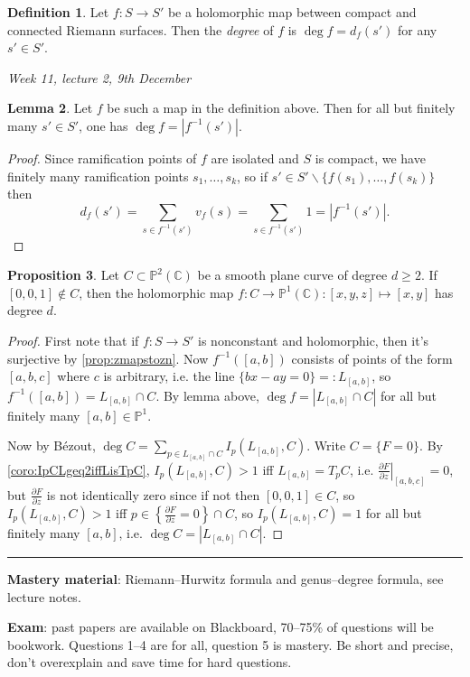 \documentclass{article}
\newcommand{\C}{\mathbb{C}}
\newcommand{\p}{\mathbb{P}}
\theoremstyle{definition}
\newtheorem{defn}{Definition}[subsection]
\newtheorem{prop}[defn]{Proposition}
\newtheorem{lemma}[defn]{Lemma}
\begin{document}
\begin{defn}
Let $f:S\rightarrow S'$ be a holomorphic map between compact and connected Riemann surfaces. Then the \textit{degree} of $f$ is $\deg f=d_f(s')$ for any $s'\in S'$.
\end{defn}

\begin{flushright}
\textit{Week 11, lecture 2, 9th December}
\end{flushright}

\begin{lemma}
Let $f$ be such a map in the definition above. Then for all but finitely many $s'\in S'$, one has $\deg f=\left|f^{-1}(s')\right|$.
\end{lemma}
\begin{proof}
Since ramification points of $f$ are isolated and $S$ is compact, we have finitely many ramification points $s_1,\ldots,s_k$, so if $s'\in S'\backslash\{f(s_1),\ldots,f(s_k)\}$ then
\[
d_f(s')=\sum_{s\in f^{-1}(s')}v_f(s)=\sum_{s\in f^{-1}(s')}1=\left|f^{-1}(s')\right|.
\]
\end{proof}

\begin{prop}
Let $C\subset\p^2(\C)$ be a smooth plane curve of degree $d\geq 2$. If $[0,0,1]\notin C$, then the holomorphic map $f:C\rightarrow\p^1(\C):[x,y,z]\mapsto [x,y]$ has degree $d$.
\end{prop}
\begin{proof}
First note that if $f:S\rightarrow S'$ is nonconstant and holomorphic, then it's surjective by \ref{prop:zmapstozn}. Now $f^{-1}([a,b])$ consists of points of the form $[a,b,c]$ where $c$ is arbitrary, i.e. the line $\{bx-ay=0\}=:L_{[a,b]}$, so $f^{-1}([a,b])=L_{[a,b]}\cap C$. By lemma above, $\deg f=\left|L_{[a,b]}\cap C\right|$ for all but finitely many $[a,b]\in\p^1$.

Now by Bézout, $\deg C=\sum_{p\in L_{[a,b]}\cap C}I_p\left(L_{[a,b]},C\right)$. Write $C=\{F=0\}$. By \ref{coro:IpCLgeq2iffLisTpC}, $I_p\left(L_{[a,b]},C\right)>1$ iff $L_{[a,b]}=T_pC$, i.e. $\left. \frac{\partial F}{\partial z}\right|_{[a,b,c]}=0$, but $\frac{\partial F}{\partial z}$ is not identically zero since if not then $[0,0,1]\in C$, so $I_p\left(L_{[a,b]},C\right)>1$ iff $p\in\left\{\frac{\partial F}{\partial z}=0\right\}\cap C$, so $I_p\left(L_{[a,b]},C\right)=1$ for all but finitely many $[a,b]$, i.e. $\deg C=\left|L_{[a,b]}\cap C\right|$.
\end{proof}

\hrule

\hspace{1mm}

\textbf{Mastery material}: Riemann--Hurwitz formula and genus--degree formula, see lecture notes.

\textbf{Exam}: past papers are available on Blackboard, 70--75\% of questions will be bookwork. Questions 1--4 are for all, question 5 is mastery. Be short and precise, don't overexplain and save time for hard questions.
\end{document}
